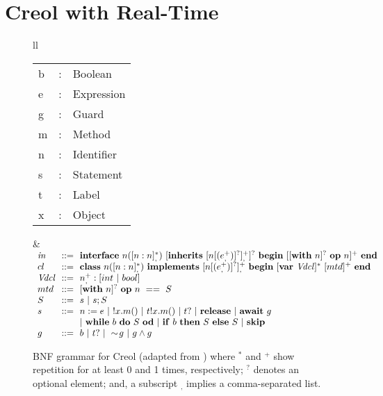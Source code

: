 \documentclass[copyright,creativecommons]{eptcs}
\theoremstyle{definition}
\newcommand{\id}[1]{\mathit{#1}}
\newcommand{\tneg}{\sim\!}
\begin{document}
\section{Creol with Real-Time}
\label{sec::rtcreol}

\lstset{language=Credo, basicstyle=\scriptsize\ttfamily} 

\begin{figure}[tb]
\begin{tabular}{ll}
{ \small \begin{tabular}{l@{~}c@{~~}l}
b &:& Boolean \\
e &:& Expression \\
g&:& Guard  \\
m&:&Method \\
n &:& Identifier \\
s &:& Statement \\
t &:& Label \\
x &:& Object \\

\end{tabular}
}
&
{\small
\begin{math}
\begin{array}{l@{~~}r@{~~}l}
\id{in}\ &::=& \id{\bf interface} ~ n([n:n]^*_,) ~[\id{\bf inherits} ~[n[(e^+_,)]^?]^+_,]^?
~ \id{\bf begin} ~ [[\id{\bf with}~ n]^?~\id{\bf op} ~n]^+ ~\id{\bf end}\\
cl\ &::=& \id{\bf class} ~ n([n:n]^*_,) ~ \id{\bf implements}~ [n[(e^+_,)]^?]^+_,
~ \id{\bf begin} ~ [\id{\bf var}\  \id{Vdcl}]^* ~[mtd]^+ ~\id{\bf end}\\
\id{Vdcl}& ::= & n^+_, : [int ~|~ bool] \\
mtd & ::=& [\id{\bf with}~ n]^?~\id{\bf op} ~n~ ==~ S \\
S\ & ::= & s \ | \ s;S \\
s\ &::= & n := e\ |\ !x.m()\ | \ t!x.m() \ | \ t? ~|\ \id{\bf release}\ |\  \id{\bf await}\ g ~\\
&&| \  \id{\bf while}\ b\ \id{\bf do}\ S\  \id{\bf od}
~ | \ \id{\bf if}\ b\ \id{\bf then}\ S\ \id{\bf else}\ S ~|~ \id{\bf skip} \\ g\ &::=& b\ |\ t?\ |\ \tneg g\ |\ g \land g \\
\end{array}
\end{math}
}
\end{tabular}
\caption{BNF  grammar for Creol (adapted from \cite{johnsen07sosym}) where $^*$ and $^+$ show repetition for at least 0 and 1 times, respectively; $^?$ denotes an optional element; and, a subscript $_,$ implies a comma-separated list.}\label{fig::creolSyntax}
\end{figure}
\end{document}
